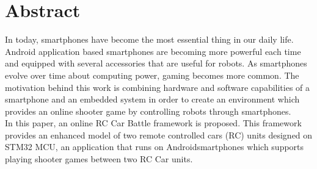 \chapter*{Abstract}

In today, smartphones have become the most essential thing in our daily life. Android application based smartphones are becoming more powerful each time and equipped with several accessories that are useful for robots. As smartphones evolve over time about computing power, gaming becomes more common. The motivation behind this work is combining hardware and software capabilities of a smartphone and an embedded system in order to create an environment which provides an online shooter game by controlling robots through smartphones.\\ 

In this paper, an online RC Car Battle framework is proposed. This framework provides an enhanced model of two remote controlled cars (RC) units designed on STM32 MCU, an application that runs on Android\texttrademark\;smartphones which supports playing shooter games between two RC Car units. 
\vfill
\clearpage